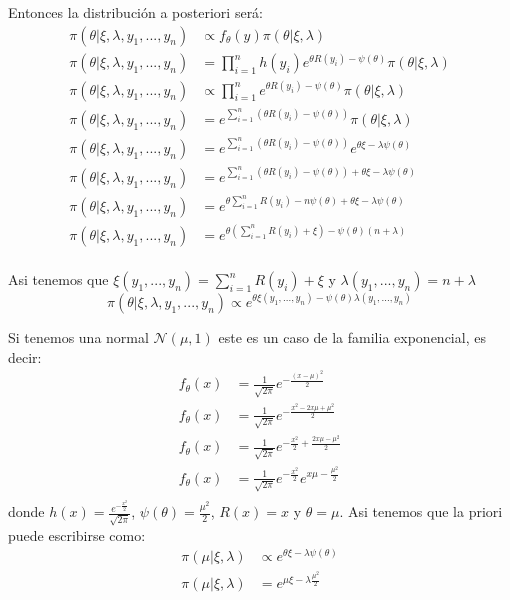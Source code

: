 \documentclass[12pt,]{article}
\begin{document}
Entonces la distribución a posteriori será: \[
\begin{array}{rl}
\pi (\theta | \xi, \lambda, y_1,...,y_n) & \propto f_\theta(y)\pi(\theta|\xi, \lambda)\\
\pi (\theta | \xi, \lambda, y_1,...,y_n)& = \prod_{i=1}^n h(y_i)e^{\theta R(y_i)-\psi(\theta)}\pi(\theta|\xi, \lambda)\\
\pi (\theta | \xi, \lambda, y_1,...,y_n)& \propto \prod_{i=1}^n e^{\theta R(y_i)-\psi(\theta)}\pi(\theta|\xi, \lambda)\\
\pi (\theta | \xi, \lambda, y_1,...,y_n)& = e^{\sum_{i=1}^n (\theta R(y_i)-\psi(\theta))}\pi(\theta|\xi, \lambda)\\
\pi (\theta | \xi, \lambda, y_1,...,y_n)& = e^{\sum_{i=1}^n (\theta R(y_i)-\psi(\theta))}e^{\theta\xi -\lambda\psi(\theta)}\\
\pi (\theta | \xi, \lambda, y_1,...,y_n)& = e^{\sum_{i=1}^n (\theta R(y_i)-\psi(\theta))+\theta\xi -\lambda\psi(\theta)}\\
\pi (\theta | \xi, \lambda, y_1,...,y_n)& = e^{ \theta\sum_{i=1}^n R(y_i)-n\psi(\theta)+\theta\xi -\lambda\psi(\theta)}\\
\pi (\theta | \xi, \lambda, y_1,...,y_n) & = e^{ \theta(\sum_{i=1}^n R(y_i)+\xi)-\psi(\theta)(n+\lambda)}\\
\end{array}
\]

Asi tenemos que \(\xi(y_1,...,y_n)=\sum_{i=1}^n R(y_i)+\xi\) y
\(\lambda(y_1,...,y_n)=n+\lambda\)
\[\pi (\theta | \xi, \lambda, y_1,...,y_n)\propto e^{ \theta\xi(y_1,...,y_n)-\psi(\theta)\lambda(y_1,...,y_n)}\]

Si tenemos una normal \(\mathcal{N}(\mu,1)\) este es un caso de la
familia exponencial, es decir: \[
\begin{array}{rl}
f_\theta(x)&=\frac{1}{\sqrt{2\pi}}e^{-\frac{(x-\mu)^2}{2}}\\
f_\theta(x)&=\frac{1}{\sqrt{2\pi}}e^{-\frac{x^2-2x\mu+ \mu^2}{2}}\\
f_\theta(x)&=\frac{1}{\sqrt{2\pi}}e^{-\frac{x^2}{2}+\frac{2x\mu- \mu^2}{2}}\\
f_\theta(x)&=\frac{1}{\sqrt{2\pi}}e^{-\frac{x^2}{2}} e^{x\mu-\frac{\mu^2}{2}}\\
\end{array}
\] donde \(h(x)=\frac{e^{-\frac{x^2}{2}}}{\sqrt{2\pi}}\),
\(\psi(\theta)=\frac{\mu^2}{2}\), \(R(x)=x\) y \(\theta=\mu\). Asi
tenemos que la priori puede escribirse como: \[
\begin{array}{rl}
\pi(\mu|\xi,\lambda) & \propto e^{\theta\xi-\lambda\psi(\theta)}\\
\pi(\mu|\xi,\lambda) & = e^{\mu\xi-\lambda\frac{\mu^2}{2}}
\end{array}
\]
\end{document}
